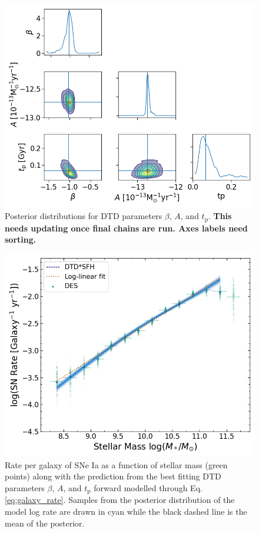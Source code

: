 \documentclass[fleqn,usenatbib]{mnras}
\begin{document}
\begin{figure}
    \centering
    \includegraphics[width=.5\textwidth]{figs/beta_A_tp_Qerf1.1_corner.png}
    \caption{Posterior distributions for DTD parameters $\beta$, $A$, and $t_{\mathrm{p}}$. \textbf{This needs updating once final chains are run. Axes labels need sorting.} %
    \label{fig:corner_beta_norm_tp}}
\end{figure}


\begin{figure}
    \centering
    \includegraphics[width=.5\textwidth]{figs/rate_vs_mass_DTD_fit_beta_norm_Qerf1.1.png}
    \caption{Rate per galaxy of SNe Ia as a function of stellar mass (green points) along with the prediction from the best fitting DTD parameters $\beta$, $A$, and $t_{\mathrm{p}}$ forward modelled through Eq. \ref{eq:galaxy_rate}. Samples from the posterior distribution of the model log rate are drawn in cyan while the black dashed line is the mean of the posterior.%
    \label{fig:rate_fitted}}
\end{figure}
\end{document}
